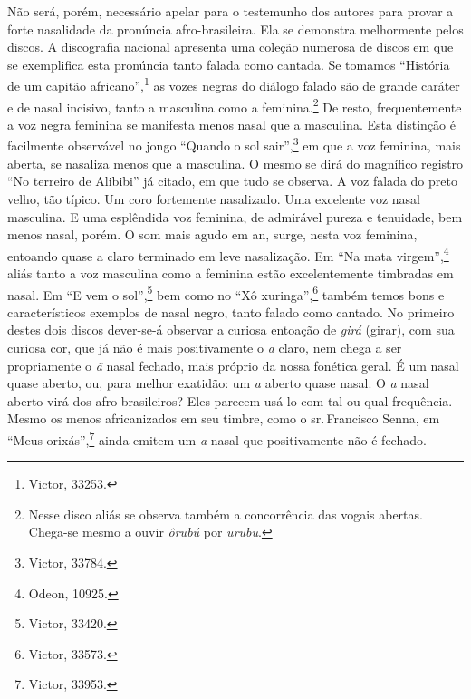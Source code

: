 Não será, porém, necessário apelar para o testemunho dos autores para
provar a forte nasalidade da pronúncia afro-brasileira. Ela se demonstra
melhormente pelos discos. A discografia nacional apresenta uma coleção
numerosa de discos em que se exemplifica esta pronúncia tanto falada
como cantada. Se tomamos ``História de um capitão africano'',\footnote{Victor,
33253.} as vozes negras do diálogo falado são de grande caráter e de
nasal incisivo, tanto a masculina como a feminina.\footnote{Nesse disco aliás se observa também a concorrência das vogais
abertas. Chega-se mesmo a ouvir \textit{ôrubú} por \textit{urubu}.} De resto,
frequentemente a voz negra feminina se manifesta menos nasal que a
masculina. Esta distinção é facilmente observável no jongo ``Quando o
sol sair'',\footnote{Victor, 33784.} em que a voz feminina, mais aberta, se
nasaliza menos que a masculina. O mesmo se dirá do magnífico registro
``No terreiro de Alibibi'' já citado, em que tudo se observa. A voz
falada do preto velho, tão típico. Um coro fortemente nasalizado. Uma
excelente voz nasal masculina. E uma esplêndida voz feminina, de
admirável pureza e tenuidade, bem menos nasal, porém. O som mais agudo
em an, surge, nesta voz feminina, entoando quase a claro terminado em
leve nasalização. Em ``Na mata virgem'',\footnote{Odeon, 10925.} aliás tanto a voz
masculina como a feminina estão excelentemente timbradas em nasal. Em ``E
vem o sol'',\footnote{Victor, 33420.} bem como no ``Xô xuringa'',\footnote{Victor, 33573.}
também temos bons e característicos exemplos de nasal negro, tanto
falado como cantado. No primeiro destes dois discos dever-se-á observar
a curiosa entoação de \textit{girá} (girar), com sua curiosa cor, que já não
é mais positivamente o \textit{a} claro, nem chega a ser propriamente o \textit{ã} nasal
fechado, mais próprio da nossa fonética geral. É um nasal quase aberto,
ou, para melhor exatidão: um \textit{a} aberto quase nasal. O \textit{a} nasal aberto virá
dos afro-brasileiros? Eles parecem usá-lo com tal ou qual frequência.
Mesmo os menos africanizados em seu timbre, como o sr.\,Francisco Senna,
em ``Meus orixás'',\footnote{Victor, 33953.} ainda emitem um \textit{a} nasal que
positivamente não é fechado.

